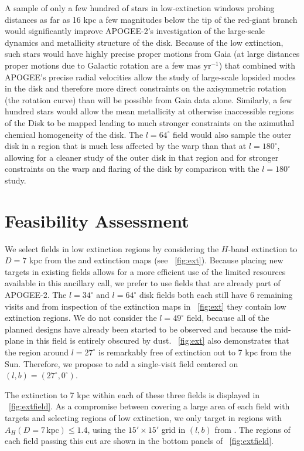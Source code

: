 \documentclass[12pt,preprint]{aastex}
\begin{document}
A sample of only a few hundred of stars in low-extinction windows
probing distances as far as 16 kpc a few magnitudes below the tip of
the red-giant branch would significantly improve APOGEE-2's
investigation of the large-scale dynamics and metallicity structure of
the disk. Because of the low extinction, such stars would have highly
precise proper motions from Gaia (at large distances proper motions
due to Galactic rotation are a few mas yr$^{-1}$) that combined with
APOGEE's precise radial velocities allow the study of large-scale
lopsided modes in the disk and therefore more direct constraints on
the axisymmetric rotation (the rotation curve) than will be possible
from Gaia data alone. Similarly, a few hundred stars would allow the
mean metallicity at otherwise inaccessible regions of the Disk to be
mapped leading to much stronger constraints on the azimuthal chemical
homogeneity of the disk. The $l=64^\circ$ field would also sample the
outer disk in a region that is much less affected by the warp than
that at $l=180^\circ$, allowing for a cleaner study of the outer disk in that
region and for stronger constraints on the warp and flaring of the
disk by comparison with the $l=180^\circ$ study.

\section{Feasibility Assessment}

We select fields in low extinction regions by considering the $H$-band
extinction to $D=7$ kpc from the \citet{Marshall06a} and
\citet{Green15a} extinction maps (see
\figurename~\ref{fig:ext}). Because placing new targets in existing
fields allows for a more efficient use of the limited resources
available in this ancillary call, we prefer to use fields that are
already part of APOGEE-2. The $l=34^\circ$ and $l=64^\circ$ disk
fields both each still have 6 remaining visits and from inspection of
the extinction maps in \figurename~\ref{fig:ext} they contain low
extinction regions. We do not consider the $l=49^\circ$ field, because
all of the planned designs have already been started to be observed
and because the mid-plane in this field is entirely obscured by
dust. \figurename~\ref{fig:ext} also demonstrates that the region
around $l=27^\circ$ is remarkably free of extinction out to 7 kpc from
the Sun. Therefore, we propose to add a single-visit field centered on
$(l,b) = (27^\circ,0^\circ)$.

The extinction to 7 kpc within each of these three fields is displayed
in \figurename~\ref{fig:extfield}. As a compromise between covering a
large area of each field with targets and selecting regions of low
extinction, we only target in regions with $A_H(D=7\,\mathrm{kpc})
\leq 1.4$, using the $15'\times15'$ grid in $(l,b)$ from
\citet{Marshall06a}. The regions of each field passing this cut are
shown in the bottom panels of \figurename~\ref{fig:extfield}.
\end{document}
